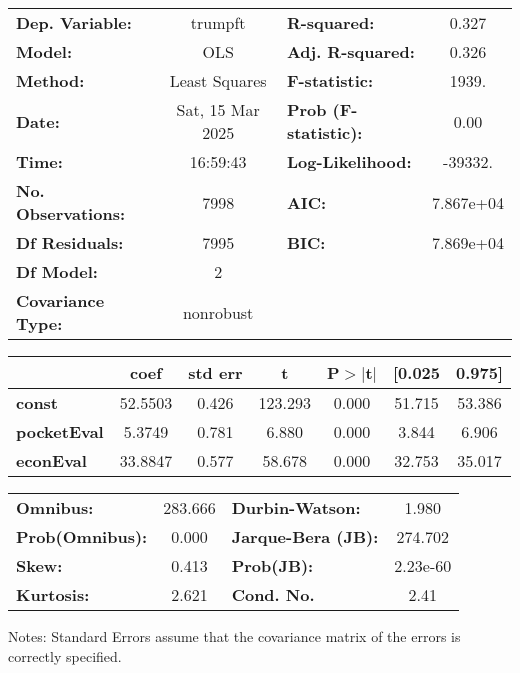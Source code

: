 \begin{center}
\begin{tabular}{lclc}
\toprule
\textbf{Dep. Variable:}    &     trumpft      & \textbf{  R-squared:         } &     0.327   \\
\textbf{Model:}            &       OLS        & \textbf{  Adj. R-squared:    } &     0.326   \\
\textbf{Method:}           &  Least Squares   & \textbf{  F-statistic:       } &     1939.   \\
\textbf{Date:}             & Sat, 15 Mar 2025 & \textbf{  Prob (F-statistic):} &     0.00    \\
\textbf{Time:}             &     16:59:43     & \textbf{  Log-Likelihood:    } &   -39332.   \\
\textbf{No. Observations:} &        7998      & \textbf{  AIC:               } & 7.867e+04   \\
\textbf{Df Residuals:}     &        7995      & \textbf{  BIC:               } & 7.869e+04   \\
\textbf{Df Model:}         &           2      & \textbf{                     } &             \\
\textbf{Covariance Type:}  &    nonrobust     & \textbf{                     } &             \\
\bottomrule
\end{tabular}
\begin{tabular}{lcccccc}
                    & \textbf{coef} & \textbf{std err} & \textbf{t} & \textbf{P$> |$t$|$} & \textbf{[0.025} & \textbf{0.975]}  \\
\midrule
\textbf{const}      &      52.5503  &        0.426     &   123.293  &         0.000        &       51.715    &       53.386     \\
\textbf{pocketEval} &       5.3749  &        0.781     &     6.880  &         0.000        &        3.844    &        6.906     \\
\textbf{econEval}   &      33.8847  &        0.577     &    58.678  &         0.000        &       32.753    &       35.017     \\
\bottomrule
\end{tabular}
\begin{tabular}{lclc}
\textbf{Omnibus:}       & 283.666 & \textbf{  Durbin-Watson:     } &    1.980  \\
\textbf{Prob(Omnibus):} &   0.000 & \textbf{  Jarque-Bera (JB):  } &  274.702  \\
\textbf{Skew:}          &   0.413 & \textbf{  Prob(JB):          } & 2.23e-60  \\
\textbf{Kurtosis:}      &   2.621 & \textbf{  Cond. No.          } &     2.41  \\
\bottomrule
\end{tabular}
\end{center}

Notes: \newline
 [1] Standard Errors assume that the covariance matrix of the errors is correctly specified.